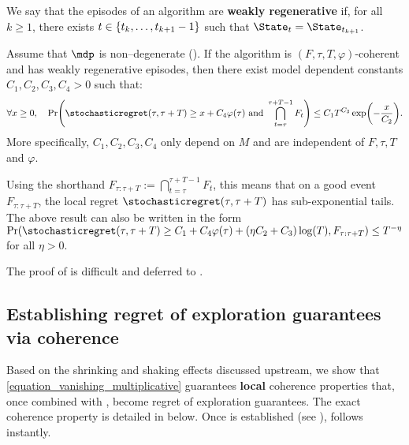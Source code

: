 \documentclass[preprint,cleveref,12pt]{colt2025}
\DeclarePairedDelimiter{\braces}{\{}{\}}	%
\DeclarePairedDelimiter{\parens}{(}{)}	%
\def\model{\mdp}
\newcommand{\strong}[1]{\textbf{#1}}
\begin{document}
    \begin{definition}
    \label{definition_regenerative_episodes}
        We say that the episodes of an algorithm are \strong{weakly regenerative} if, for all $k \ge 1$, there exists $t \in \braces{t_k, \ldots, t_{k+1}-1}$ such that $\State_t = \State_{t_{k+1}}$. 
    \end{definition}

    \begin{lemma}
        \label{lemma_coherence}
        Assume that $\model$ is non--degenerate ().
        If the algorithm is $(F, \tau, T, \varphi)$-coherent and has weakly regenerative episodes, then there exist model dependent constants $C_1, C_2, C_3, C_4 > 0$ such that: 
        \begin{equation*}
            \forall x \ge 0,
            \quad
            \Pr \parens*{
                \stochasticregret(\tau, \tau + T) 
                \ge 
                x + C_4 \varphi(\tau)
                \text{~and~}
                \bigcap_{t=\tau}^{\tau+T-1} F_t
            }
            \le
            C_1 T^{C_3}
            \exp\parens*{
                - \frac x{C_2}
            }
            .
        \end{equation*}
        More specifically, $C_1, C_2, C_3, C_4$ only depend on $M$ and are independent of $F, \tau, T$ and $\varphi$.
    \end{lemma}

    Using the shorthand $F_{\tau:\tau+T} := \bigcap_{t=\tau}^{\tau+T-1} F_t$, this means that on a good event $F_{\tau: \tau+T}$, the local regret $\stochasticregret(\tau, \tau+T)$ has sub-exponential tails.
    The above result can also be written in the form $\Pr(\stochasticregret(\tau, \tau+T) \ge C_1 + C_4 \varphi(\tau) + (\eta C_2 + C_3) \log(T), F_{\tau:\tau+T}) \le T^{-\eta}$ for all $\eta > 0$.

    The proof of  is difficult and deferred to .

    \subsection{Establishing regret of exploration guarantees via coherence}
    \label{section_establishing_coherence}

    Based on the shrinking and shaking effects discussed upstream, we show that \eqref{equation_vanishing_multiplicative} guarantees \strong{local} coherence properties that, once combined with , become regret of exploration guarantees. 
    The exact coherence property is detailed in  below.
    Once  is established (see ),  follows instantly. 
\end{document}
